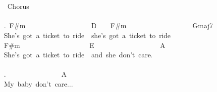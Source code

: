 {\\
\\
\lbrack\ Chorus\rbrack\\
\\
.\ F\#m\ \ \ \ \ \ \ \ \ \ \ \ \ \ \ \ \ \ \ D\ \ \ \ F\#m\ \ \ \ \ \ \ \ \ \ \ \ \ \ \ \ \ \ \ Gmaj7\\
She's\ got\ a\ ticket\ to\ ride\ \ she's\ got\ a\ ticket\ to\ ride\\
F\#m\ \ \ \ \ \ \ \ \ \ \ \ \ \ \ \ \ \ \ \ E\ \ \ \ \ \ \ \ \ \ \ \ \ \ \ \ \ \ \ A\\
She's\ got\ a\ ticket\ to\ ride\ \ and\ she\ don't\ care.\\
\\
.\ \ \ \ \ \ \ \ \ \ \ \ \ \ \ \ A\\
My\ baby\ don't\ care...\\}
